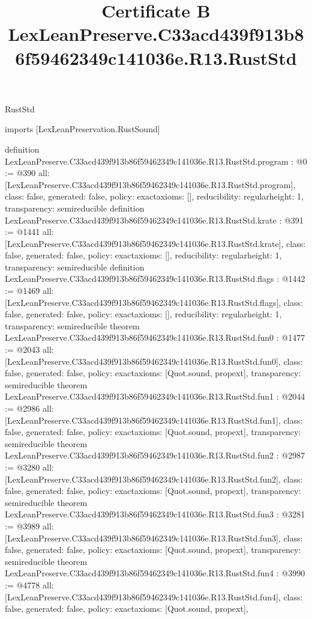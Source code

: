 \begin{lexlean}{RustStd}
\title{Certificate B LexLeanPreserve.C33acd439f913b86f59462349c141036e.R13.RustStd}
\begin{coremodule}
imports [LexLeanPreservation.RustSound]

definition LexLeanPreserve.C33acd439f913b86f59462349c141036e.R13.RustStd.program : @0 := @390 {
  all: [LexLeanPreserve.C33acd439f913b86f59462349c141036e.R13.RustStd.program],
  class: false,
  generated: false,
  policy: exact{axioms: []},
  reducibility: regular{height: 1},
  transparency: semireducible
}
definition LexLeanPreserve.C33acd439f913b86f59462349c141036e.R13.RustStd.krate : @391 := @1441 {
  all: [LexLeanPreserve.C33acd439f913b86f59462349c141036e.R13.RustStd.krate],
  class: false,
  generated: false,
  policy: exact{axioms: []},
  reducibility: regular{height: 1},
  transparency: semireducible
}
definition LexLeanPreserve.C33acd439f913b86f59462349c141036e.R13.RustStd.flags : @1442 := @1469 {
  all: [LexLeanPreserve.C33acd439f913b86f59462349c141036e.R13.RustStd.flags],
  class: false,
  generated: false,
  policy: exact{axioms: []},
  reducibility: regular{height: 1},
  transparency: semireducible
}
theorem LexLeanPreserve.C33acd439f913b86f59462349c141036e.R13.RustStd.fun0 : @1477 := @2043 {
  all: [LexLeanPreserve.C33acd439f913b86f59462349c141036e.R13.RustStd.fun0],
  class: false,
  generated: false,
  policy: exact{axioms: [Quot.sound, propext]},
  transparency: semireducible
}
theorem LexLeanPreserve.C33acd439f913b86f59462349c141036e.R13.RustStd.fun1 : @2044 := @2986 {
  all: [LexLeanPreserve.C33acd439f913b86f59462349c141036e.R13.RustStd.fun1],
  class: false,
  generated: false,
  policy: exact{axioms: [Quot.sound, propext]},
  transparency: semireducible
}
theorem LexLeanPreserve.C33acd439f913b86f59462349c141036e.R13.RustStd.fun2 : @2987 := @3280 {
  all: [LexLeanPreserve.C33acd439f913b86f59462349c141036e.R13.RustStd.fun2],
  class: false,
  generated: false,
  policy: exact{axioms: [Quot.sound, propext]},
  transparency: semireducible
}
theorem LexLeanPreserve.C33acd439f913b86f59462349c141036e.R13.RustStd.fun3 : @3281 := @3989 {
  all: [LexLeanPreserve.C33acd439f913b86f59462349c141036e.R13.RustStd.fun3],
  class: false,
  generated: false,
  policy: exact{axioms: [Quot.sound, propext]},
  transparency: semireducible
}
theorem LexLeanPreserve.C33acd439f913b86f59462349c141036e.R13.RustStd.fun4 : @3990 := @4778 {
  all: [LexLeanPreserve.C33acd439f913b86f59462349c141036e.R13.RustStd.fun4],
  class: false,
  generated: false,
  policy: exact{axioms: [Quot.sound, propext]},
}
\end{coremodule}
\end{lexlean}
